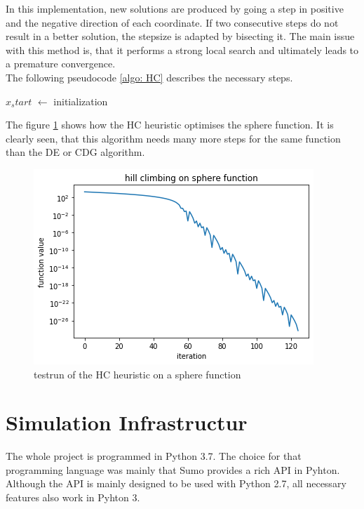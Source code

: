 \documentclass[./\jobname.tex]{subfiles}
\begin{document}
In this implementation, new solutions are produced by going a step in positive and the negative direction of each coordinate. If two consecutive steps do not result in a better solution, the stepsize is adapted by bisecting it. The main issue with this method is, that it performs a strong local search and ultimately leads to a premature convergence. \\

The following pseudocode \ref{algo: HC} describes the necessary steps. 

\begin{algorithm}[H]
	\SetAlgoNoLine
	\DontPrintSemicolon
	$x_start$ $\gets$ initialization\;
	\label{algo: HC}
\end{algorithm}

The figure \ref{fig:HC_verification} shows how the HC heuristic optimises the sphere function. It is clearly seen, that this algorithm needs many more steps for the same function than the DE or CDG algorithm. 

\begin{figure}[H]
	\centering
	\includegraphics[width=0.9\linewidth]{../img/png/hill_climbing_varification.png}
	\caption{testrun of the HC heuristic on a sphere function}
	\label{fig:HC_verification}
\end{figure}


\chapter{Simulation Infrastructur}
The whole project is programmed in Python 3.7. The choice for that programming language was mainly that Sumo provides a rich API in Pyhton. Although the API is mainly designed to be used with Python 2.7, all necessary features also work in Pyhton 3. \\
\end{document}
